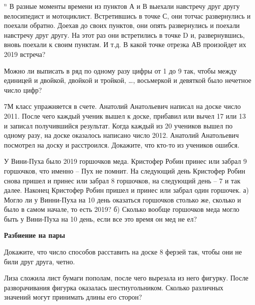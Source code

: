 \begin{thm}$^n$\label{1.21} В разные моменты времени из пунктов А и В выехали навстречу друг другу велосипедист и мотоциклист. Встретившись в точке С, они тотчас развернулись и поехали обратно. Доехав до своих пунктов, они опять развернулись и поехали навстречу друг другу. На этот раз они встретились в точке D и, развернувшись, вновь поехали к своим пунктам. И т.д. В какой точке отрезка АВ произойдет их 2019 встреча?
\end{thm}

\begin{thm}\label{1.14}Можно ли выписать в ряд по одному разу цифры от 1 до 9 так, чтобы между единицей и двойкой, двойкой и тройкой, \dots, восьмеркой и девяткой было нечетное число цифр?
\end{thm}

\begin{thm}\label{1.15}7М класс упражняется в счете. Анатолий Анатольевич написал на доске число 2011. После чего каждый ученик вышел к доске, прибавил или вычел 17 или 13 и записал получившийся результат. Когда каждый из 20 учеников вышел по одному разу, на доске оказалось написано число 2012. Анатолий Анатольевич посмотрел на доску и расстроился. Докажите, что кто-то из учеников ошибся.
\end{thm}

\begin{thm}\label{1.16}
	У Вини-Пуха было 2019 горшочков меда. Кристофер Робин принес или забрал 9 горшочков, что именно – Пух не помнит. На следующий день Кристофер Робин снова пришел и принес или забрал 8 горшочков, на следующий день – 7 и так далее. Наконец Кристофер Робин пришел и принес или забрал один горшочек.  а) Могло ли у Винни-Пуха на 10 день оказаться горшочков столько же, сколько и было в самом начале, то есть 2019? б) Сколько вообще горшочков меда могло быть у Вини-Пуха на 10 день, если все это время он мед не ел?
\end{thm}
\begin{center}
	\textbf{Разбиение на пары}
\end{center}
\begin{thm}
	Докажите, что число способов расставить на доске 8 ферзей так, чтобы они не били друг друга, четно.
\end{thm}

\begin{thm}
	Лиза сложила лист бумаги пополам, после чего вырезала из него фигурку. После разворачивания фигурка оказалась шестиугольником. Сколько различных значений могут принимать длины его сторон?
\end{thm}

